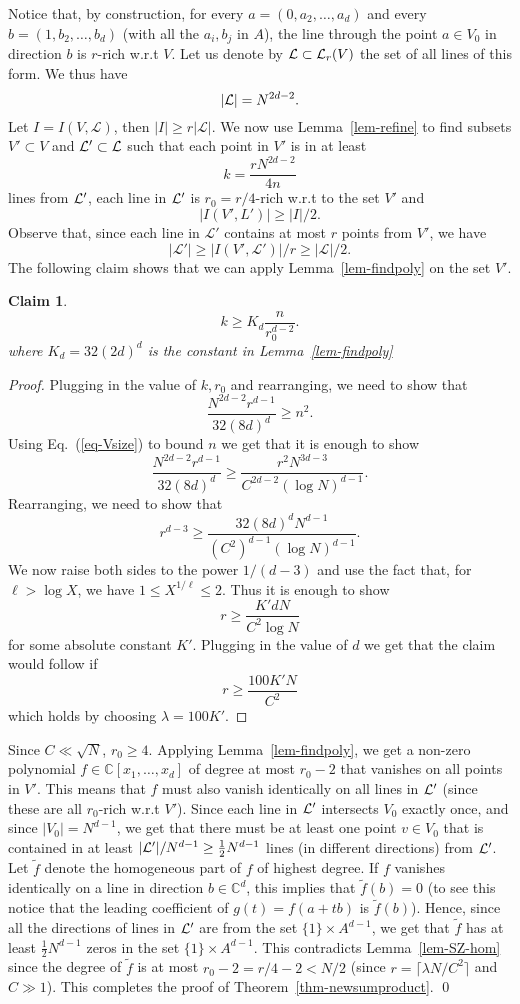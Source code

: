 \documentclass[11pt]{article}
\newtheorem{claim}[thm]{Claim}
\def\L{{\mathcal L}}
\def\C{{\mathbb{C}}}
\def\cL{{\cal L}}
\begin{document}
Notice that, by construction, for every $a = (0,a_2,\ldots,a_d)$ and every $b = (1,b_2,\ldots,b_d)$ (with all the $a_i,b_j$ in $A$), the line through the point $a \in V_0$ in direction $b$ is $r$-rich w.r.t  $V$. Let us denote by $\cL \subset \cL_r(V)$ the set of all lines of this form. We thus have
\begin{equation}
	|\cL|  = N^{2d-2}.
\end{equation}
Let $I=I(V,\L)$, then $|I|\ge r|\L|$.
We now use Lemma~\ref{lem-refine} to find subsets $V' \subset V$ and $\cL' \subset \cL$ such that each point in $V'$ is in at least 
$$ k = \frac{rN^{2d-2}}{4n}$$ lines from $\cL'$, each line in $\cL'$ is $r_0=r/4$-rich w.r.t to the set $V'$ and $$|I(V',L')|\ge |I|/2.$$ Observe that, since each line in $\L'$ contains at most $r$ points from $V'$, we have  $$|\L'|\ge |I(V',\L')|/r\ge |\L|/2.$$ The following claim shows that we can apply Lemma~\ref{lem-findpoly} on the set $V'$.
\begin{claim}
$$ k \geq K_d\frac{n}{r_0^{d-2}}.$$ where $K_d=32(2d)^d$ is the constant in Lemma~\ref{lem-findpoly}
\end{claim}
\begin{proof}
Plugging in the value of $k,r_0$ and rearranging, we need to show that
$$  \frac{N^{2d-2} r^{d-1}}{32(8d)^d} \geq n^2.$$
Using Eq.~(\ref{eq-Vsize}) to bound $n$ we get that it is enough to show
$$ \frac{N^{2d-2}r^{d-1}}{32(8d)^d} \geq  \frac{r^2 N^{3d-3}}{C^{2d-2} (\log N)^{d-1}}.$$
Rearranging, we need to show that
$$  r^{d-3} \geq \frac{32(8d)^{d}N^{d-1}}{(C^2)^{d-1}(\log N)^{d-1}}.$$
We now raise both sides to the power $1/(d-3)$ and use the fact that, for $\ell > \log X$, we have $1 \leq X^{1/\ell} \leq 2$. Thus it is enough to show
$$  r \geq \frac{K' d N}{C^2 \log N}$$ for some absolute constant $K'$.
Plugging in the value of $d$ we get that the claim would follow if
$$   r \geq \frac{100K'N}{C^2} $$ which holds by choosing $\lambda=100K'$.
\end{proof}

Since $C\ll\sqrt{N}$, $r_0\ge 4$. Applying Lemma~\ref{lem-findpoly}, we get a non-zero polynomial $f \in \C[x_1,\ldots,x_d]$ of degree at most $r_0-2$ that vanishes on all points in $V'$. This means that $f$ must also vanish identically on all lines in $\cL'$ (since these are all $r_0$-rich w.r.t $V'$). Since each line in $\cL'$ intersects $V_0$ exactly once, and since $|V_0| = N^{d-1}$, we get that there must be at least one point $v \in V_0$ that is contained in at least $|\cL'|/N^{d-1} \geq \frac{1}{2}N^{d-1}$ lines (in different directions) from $\cL'$. Let $\tilde f$ denote the homogeneous part of $f$ of highest degree. If $f$ vanishes identically on a line in direction $b \in \C^d$, this implies that $\tilde f(b) = 0$ (to see this notice that the leading coefficient of $g(t) = f(a + tb)$ is $\tilde f(b)$). Hence, since all the directions of lines in $\cL'$ are from the set $\{1\} \times A^{d-1}$, we get that $\tilde f$ has at least $\frac{1}{2}N^{d-1}$ zeros in the set $\{1\} \times A^{d-1}$. This contradicts Lemma~\ref{lem-SZ-hom} since the degree of $\tilde f$ is at most $r_0-2=r/4-2 < N/2$ (since $r = \lceil \lambda N/C^2 \rceil$ and $C \gg1$). This completes the proof of Theorem~\ref{thm-newsumproduct}.
\qed
\end{document}
